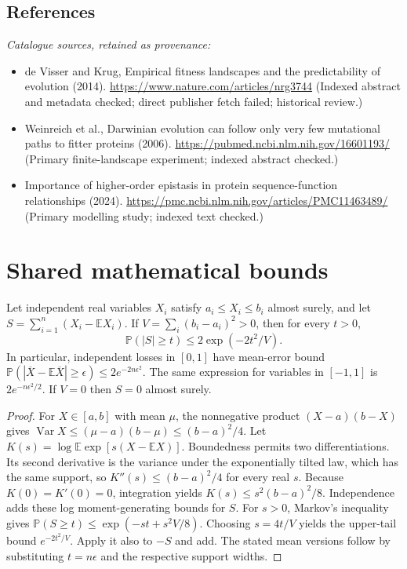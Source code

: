\documentclass[11pt]{article}
\begin{document}
\subsection{References}
\noindent\emph{Catalogue sources, retained as provenance:}
\begin{itemize}
\item de Visser and Krug, Empirical fitness landscapes and the predictability of evolution (2014). \url{https://www.nature.com/articles/nrg3744} (Indexed abstract and metadata checked; direct publisher fetch failed; historical review.)
\item Weinreich et al., Darwinian evolution can follow only very few mutational paths to fitter proteins (2006). \url{https://pubmed.ncbi.nlm.nih.gov/16601193/} (Primary finite-landscape experiment; indexed abstract checked.)
\item Importance of higher-order epistasis in protein sequence-function relationships (2024). \url{https://pmc.ncbi.nlm.nih.gov/articles/PMC11463489/} (Primary modelling study; indexed text checked.)
\end{itemize}




\section{Shared mathematical bounds}\label{app:bounds}
\begin{lemma}\label{lem:bounded}
Let independent real variables $X_i$ satisfy $a_i\leq X_i\leq b_i$ almost surely,
and let $S=\sum_{i=1}^n(X_i-\mathbb{E} X_i)$. If
$V=\sum_i(b_i-a_i)^2>0$, then for every $t>0$,
\[
 \mathbb{P}(|S|\geq t)\leq 2\exp(-2t^2/V).
\]
In particular, independent losses in $[0,1]$ have mean-error bound
$\mathbb{P}(|\overline X-\mathbb{E}\overline X|\geq\epsilon)
\leq2e^{-2n\epsilon^2}$. The same expression for variables in $[-1,1]$
is $2e^{-n\epsilon^2/2}$. If $V=0$ then $S=0$ almost surely.
\end{lemma}
\begin{proof}
For $X\in[a,b]$ with mean $\mu$, the nonnegative product
$(X-a)(b-X)$ gives
$\operatorname{Var} X\leq(\mu-a)(b-\mu)\leq(b-a)^2/4$.
Let $K(s)=\log\mathbb{E}\exp[s(X-\mathbb{E} X)]$.
Boundedness permits two differentiations. Its second derivative is the variance
under the exponentially tilted law, which has the same support, so
$K''(s)\leq(b-a)^2/4$ for every real $s$.
Because $K(0)=K'(0)=0$, integration yields
$K(s)\leq s^2(b-a)^2/8$.
Independence adds these log moment-generating bounds for $S$.
For $s>0$, Markov's inequality gives
$\mathbb{P}(S\geq t)\leq\exp(-st+s^2V/8)$.
Choosing $s=4t/V$ yields the upper-tail bound $e^{-2t^2/V}$.
Apply it also to $-S$ and add. The stated mean versions follow by substituting
$t=n\epsilon$ and the respective support widths.
\end{proof}
\end{document}
